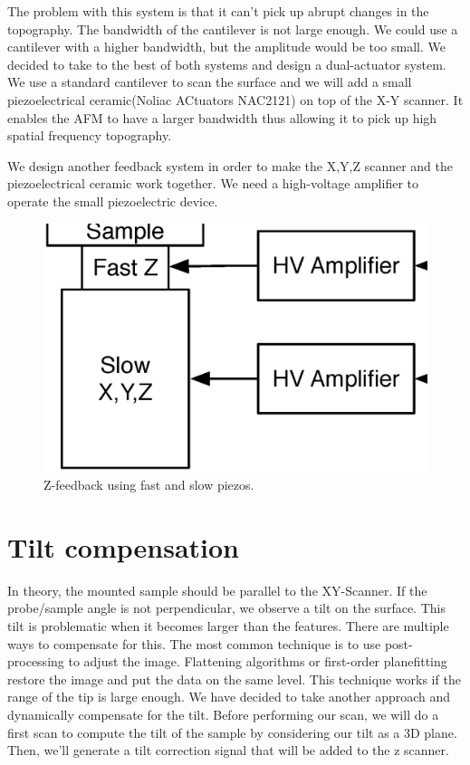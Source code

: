 The problem with this system is that it can't pick up abrupt changes in the topography.\cite{jeong:093706} The bandwidth of the cantilever is not large enough. We could use a cantilever with a higher bandwidth, but the amplitude would be too small. We decided to take to the best of both systems and design a dual-actuator system. We use a standard cantilever to scan the surface and we will add a small piezoelectrical ceramic(Noliac ACtuators NAC2121) on top of the X-Y scanner. It enables the AFM to have a larger bandwidth thus allowing it to pick up high spatial frequency topography. 

We design another feedback system in order to make the X,Y,Z scanner and the piezoelectrical ceramic work together. We need a high-voltage amplifier to operate the small piezoelectric device. \cite{el2004dual}

\begin{figure}[H]
  \centering
  \includegraphics[scale=0.3]{images/doublePID.eps}
    \caption{Z-feedback using fast and slow piezos.}
  \label{DoublePid}
\end{figure}


\section{Tilt compensation}
\label{sec:tiltcompensation}

In theory, the mounted sample should be parallel to the XY-Scanner. If the probe/sample angle is not perpendicular, we observe a tilt on the surface. This tilt is problematic when it becomes larger than the features. There are multiple ways to compensate for this. The most common technique is to use post-processing to adjust the image. Flattening algorithms or first-order planefitting restore the image and put the data on the same level. This technique works if the range of the tip is large enough. We have decided to take another approach and dynamically compensate for the tilt. Before performing our scan, we will do a first scan to compute the tilt of the sample by considering our tilt as a 3D plane. Then, we'll generate a tilt correction signal that will be added to the z scanner.

